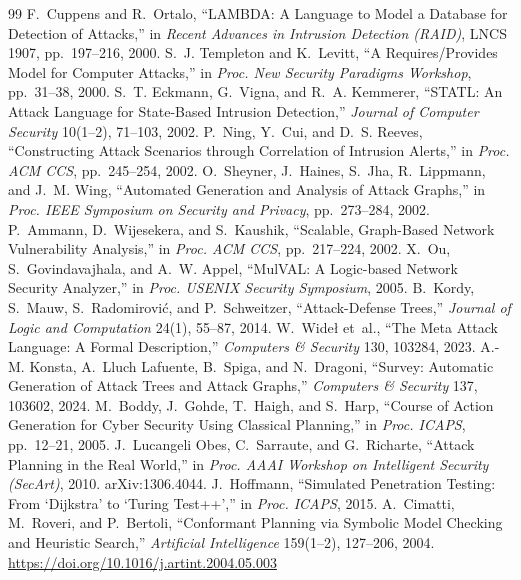 \documentclass[11pt,letterpaper]{article}
\theoremstyle{definition}
\begin{document}
\small
\begin{thebibliography}{99}\setlength{\itemsep}{1pt}
 F.~Cuppens and R.~Ortalo, ``LAMBDA: A Language to Model a Database for Detection of Attacks,'' in \emph{Recent Advances in Intrusion Detection (RAID)}, LNCS 1907, pp.~197--216, 2000.
 S.~J. Templeton and K.~Levitt, ``A Requires/Provides Model for Computer Attacks,'' in \emph{Proc. New Security Paradigms Workshop}, pp.~31--38, 2000.
 S.~T. Eckmann, G.~Vigna, and R.~A. Kemmerer, ``STATL: An Attack Language for State-Based Intrusion Detection,'' \emph{Journal of Computer Security} 10(1--2), 71--103, 2002.
 P.~Ning, Y.~Cui, and D.~S. Reeves, ``Constructing Attack Scenarios through Correlation of Intrusion Alerts,'' in \emph{Proc. ACM CCS}, pp.~245--254, 2002.
 O.~Sheyner, J.~Haines, S.~Jha, R.~Lippmann, and J.~M. Wing, ``Automated Generation and Analysis of Attack Graphs,'' in \emph{Proc. IEEE Symposium on Security and Privacy}, pp.~273--284, 2002.
 P.~Ammann, D.~Wijesekera, and S.~Kaushik, ``Scalable, Graph-Based Network Vulnerability Analysis,'' in \emph{Proc. ACM CCS}, pp.~217--224, 2002.
 X.~Ou, S.~Govindavajhala, and A.~W. Appel, ``MulVAL: A Logic-based Network Security Analyzer,'' in \emph{Proc. USENIX Security Symposium}, 2005.
 B.~Kordy, S.~Mauw, S.~Radomirovi\'c, and P.~Schweitzer, ``Attack-Defense Trees,'' \emph{Journal of Logic and Computation} 24(1), 55--87, 2014.
 W.~Wide\l{} et~al., ``The Meta Attack Language: A Formal Description,'' \emph{Computers \& Security} 130, 103284, 2023.
 A.-M. Konsta, A.~Lluch Lafuente, B.~Spiga, and N.~Dragoni, ``Survey: Automatic Generation of Attack Trees and Attack Graphs,'' \emph{Computers \& Security} 137, 103602, 2024.
 M.~Boddy, J.~Gohde, T.~Haigh, and S.~Harp, ``Course of Action Generation for Cyber Security Using Classical Planning,'' in \emph{Proc. ICAPS}, pp.~12--21, 2005.
 J.~Lucangeli Obes, C.~Sarraute, and G.~Richarte, ``Attack Planning in the Real World,'' in \emph{Proc. AAAI Workshop on Intelligent Security (SecArt)}, 2010. arXiv:1306.4044.
 J.~Hoffmann, ``Simulated Penetration Testing: From `Dijkstra' to `Turing Test++','' in \emph{Proc. ICAPS}, 2015.
 A.~Cimatti, M.~Roveri, and P.~Bertoli, ``Conformant Planning via Symbolic Model Checking and Heuristic Search,'' \emph{Artificial Intelligence} 159(1--2), 127--206, 2004. \url{https://doi.org/10.1016/j.artint.2004.05.003}

\end{thebibliography}
\end{document}
